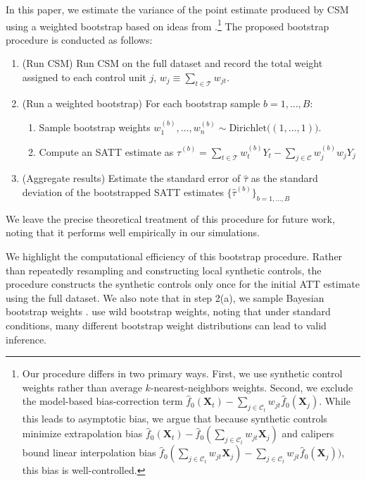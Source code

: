 \documentclass{article}
\newcommand{\Xt}{\mathbf{X}_t}
\newcommand{\Xj}{\mathbf{X}_j}
\newcommand{\Ct}{\mathcal{C}_{t}}
\begin{document}
In this paper, we estimate the variance of the point estimate produced by CSM using a weighted bootstrap based on ideas from \citet{otsu2017bootstrap}.\footnote{
    Our procedure differs in two primary ways. 
    First, we use synthetic control weights rather than average $k$-nearest-neighbors weights. 
    Second, we exclude the model-based bias-correction term $\hat{f}_0(\Xt) - \sum_{j \in \Ct} w_{jt} \hat{f}_0(\Xj)$.
    While this leads to asymptotic bias, we argue that because synthetic controls minimize extrapolation bias $\hat{f}_0(\Xt) - \hat{f}_0(\sum_{j \in \Ct} w_{jt} \Xj)$ and calipers bound linear interpolation bias $\hat{f}_0(\sum_{j \in \Ct} w_{jt} \Xj) - \sum_{j \in \Ct} w_{jt} \hat{f}_0(\Xj))$, this bias is well-controlled.}
The proposed bootstrap procedure is conducted as follows:
\begin{enumerate}
    \item (Run CSM) Run CSM on the full dataset and record the total weight assigned to each control unit $j$, $w_j \equiv \sum_{t \in \mathcal{T}} w_{jt}$.
    \item (Run a weighted bootstrap) For each bootstrap sample $b = 1, \dots, B$:
    \begin{enumerate}
        \item Sample bootstrap weights $w^{(b)}_1, \dots, w^{(b)}_n \sim \text{Dirichlet}\Big((1, \dots, 1)\Big)$.
        \item Compute an SATT estimate as $\hat{\tau}^{(b)} = \sum_{t \in \mathcal{T}} w_t^{(b)} Y_t - \sum_{j \in \mathcal{C}} w_j^{(b)} w_j Y_j$
    \end{enumerate}
    \item (Aggregate results) Estimate the standard error of $\hat{\tau}$ as the standard deviation of the bootstrapped SATT estimates $\{\hat{\tau}^{(b)}\}_{b = 1, \dots, B}$
\end{enumerate}
We leave the precise theoretical treatment of this procedure for future work, noting that it performs well empirically in our simulations.

We highlight the computational efficiency of this bootstrap procedure.
Rather than repeatedly resampling and constructing local synthetic controls, the procedure constructs the synthetic controls only once for the initial ATT estimate using the full dataset.
We also note that in step 2(a), we sample Bayesian bootstrap weights \citep{rubin1981bayesian}.
\citet{otsu2017bootstrap} use wild bootstrap weights, noting that under standard conditions, many different bootstrap weight distributions can lead to valid inference.
\end{document}
